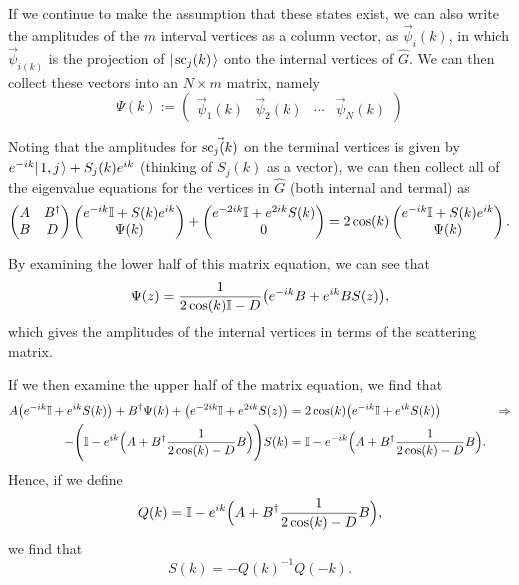 \documentclass[../thesis-main/thesis-main]{subfiles}
\begin{document}
If we continue to make the assumption that these states exist, we can also write the amplitudes of the $m$ interval vertices as a column vector, as $\vec{\psi}_i(k)$, in which $\vec{\psi}_{i(k)}$ is the projection of $|\mspace{2mu} \text{sc}_j(k) \mspace{2mu} \rangle$ onto the internal vertices of $\widehat{G}$.  We can then collect these vectors into an $N\times m$ matrix, namely
\begin{equation}
  \Psi(k) := \begin{pmatrix} \vec{\psi}_1(k) & \vec{\psi}_2(k) & \cdots & \vec{\psi}_N(k)\end{pmatrix}
\end{equation}

Noting that the amplitudes for $\vec{\text{sc}_j(k)}$ on the terminal vertices is given by $ e^{-i k} |\mspace{2mu} 1,j \mspace{2mu} \rangle + S_{j}(k)e^{ik}$ (thinking of $S_{j}(k)$ as a vector), we can then collect all of the eigenvalue equations for the vertices in $\widehat{G}$ (both internal and termal) as
\begin{equation}
  \begin{pmatrix} A & B^\dag \\
    B & D\end{pmatrix} \begin{pmatrix}  e^{-i k} \mathbb{I} + S(k) e^{i k}\\ \Psi(k)\end{pmatrix} 
    + \begin{pmatrix} e^{-2 i k} \mathbb{I} + e^{2 i k} S(k)\\ 0\end{pmatrix} = 
    2 \cos(k) \begin{pmatrix}  e^{-i k} \mathbb{I} + S(k) e^{i k}\\ \Psi(k)\end{pmatrix}.
\end{equation}

By examining the lower half of this matrix equation, we can see that
\begin{equation}
  \Psi(z) = \frac{1}{2 \cos(k) \mathbb{I} - D} \big( e^{-ik} B + e^{i k} B S(z)\big),
\end{equation}
which gives the amplitudes of the internal vertices in terms of the scattering matrix.

If we then examine the upper half of the matrix equation, we find that
\begin{align}
  A\big(e^{-ik} \mathbb{I}+ e^{i k} S(k)\big) + B^\dag \Psi(k) + \big(e^{-2 ik}\mathbb{I} + e^{2 i k} S(z)\big) &= 2 \cos(k) \big(e^{-ik} \mathbb{I} + e^{i k} S(k)\big)&\Rightarrow\\
  -\Bigg(\mathbb{I} - e^{ik}\Big(A + B^\dag \frac{1}{2 \cos(k) - D} B\Big)\Bigg)S(k) &= \mathbb{I} - e^{-ik}\Big(A + B^\dag \frac{1}{2 \cos(k) - D} B\Big).
\end{align}
Hence, if we define
\begin{equation}
  Q(k) = \mathbb{I} - e^{ik}\Big( A + B^\dag \frac{1}{2 \cos(k) - D} B\Big),
\end{equation}
we find that
\begin{equation}
  S(k) = - Q(k)^{-1} Q(-k).
\end{equation}
\end{document}
